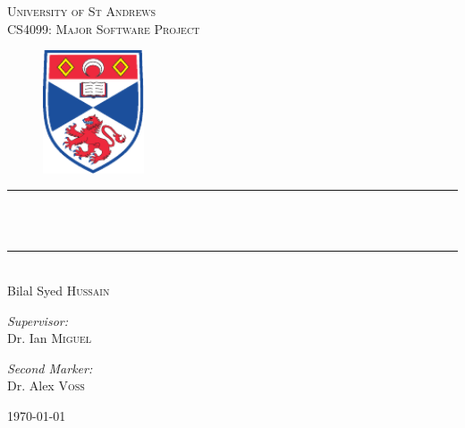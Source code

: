 
\begin{titlepage}
\thispagestyle{empty}
\begin{center}

\textsc{\LARGE University of St Andrews}\\[10pt]
\textsc{\large CS4099: Major Software Project}\\[1cm]

\begin{figure}[h!]
	\centering
	\includegraphics[width=3cm]{settings/logo.pdf}
\end{figure}


\newcommand{\HRule}{\rule{9cm}{0.5mm}}

\HRule\\[10pt]
{ \Huge \bfseries \theTitle }\\
\HRule\\[20pt]
{\LARGE Bilal Syed \textsc{Hussain}}
\vspace{1.5cm}

\begin{minipage}{0.4\textwidth}
\begin{flushleft} \large
\emph{Supervisor:} \\
Dr. Ian  \textsc{Miguel}
\end{flushleft}
\end{minipage}
\begin{minipage}{0.4\textwidth}
\begin{flushright} \large
\emph{Second Marker:} \\
Dr. Alex \textsc{Voss}
\end{flushright}
\end{minipage}

\vfill

{\large \today}
\end{center}
\end{titlepage}